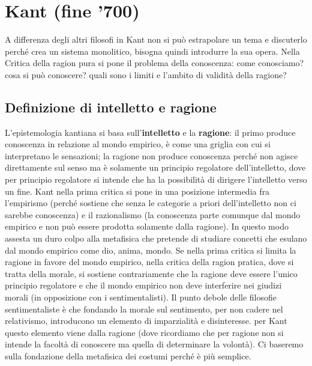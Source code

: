 \documentclass[10pt,a4paper]{article}
\begin{document}
\section{Kant (fine '700)}
A differenza degli altri filosofi in Kant non si può estrapolare un tema e discuterlo perché crea un sistema monolitico, bisogna quindi introdurre la sua opera. Nella Critica della ragion pura si pone il problema della conoscenza: come conosciamo? cosa si può conoscere? quali sono i limiti e l'ambito di validità della ragione?
\subsection{Definizione di intelletto e ragione}
L'epistemologia kantiana si basa sull'\textbf{intelletto} e la \textbf{ragione}: il primo produce conoscenza in relazione al mondo empirico, è come una griglia con cui si interpretano le sensazioni; la ragione non produce conoscenza perché non agisce direttamente sul senso ma è solamente un principio regolatore dell'intelletto, dove per principio regolatore si intende che ha la possibilità di dirigere l'intelletto verso un fine.  Kant nella prima critica si pone in una posizione intermedia fra l'empirismo (perché sostiene che senza le categorie a priori dell'intelletto non ci sarebbe conoscenza) e il razionalismo (la conoscenza parte comunque dal mondo empirico e non può essere prodotta solamente dalla ragione). In questo modo assesta un duro colpo alla metafisica che pretende di studiare concetti che esulano dal mondo empirico come dio, anima, mondo.
Se nella prima critica si limita la ragione in favore del mondo empirico, nella critica della ragion pratica, dove si tratta della morale, si sostiene contrariamente che la ragione deve essere l'unico principio regolatore e che il mondo empirico non deve interferire nei giudizi morali (in opposizione con i sentimentalisti). Il punto debole delle filosofie sentimentaliste è che fondando la morale sul sentimento, per non cadere nel relativismo, introducono un elemento di imparzialità e disinteresse. per Kant questo elemento viene dalla ragione (dove ricordiamo che per ragione non si intende la facoltà di conoscere ma quella di determinare la volontà). Ci baseremo sulla fondazione della metafisica dei costumi perché è più semplice.\\
\end{document}
